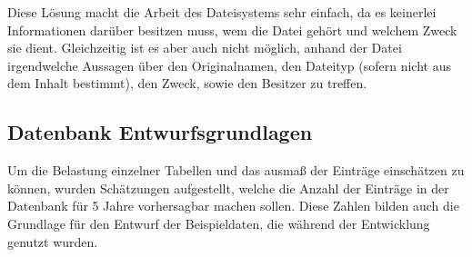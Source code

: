 Diese Lösung macht die Arbeit des Dateisystems sehr einfach, da es keinerlei Informationen darüber besitzen muss, wem die Datei gehört und welchem Zweck sie dient. Gleichzeitig ist es aber auch nicht möglich, anhand der Datei irgendwelche Aussagen über den Originalnamen, den Dateityp (sofern nicht aus dem Inhalt bestimmt), den Zweck, sowie den Besitzer zu treffen.

\subsection{Datenbank Entwurfsgrundlagen}
Um die Belastung einzelner Tabellen und das ausmaß der Einträge einschätzen zu können, wurden Schätzungen aufgestellt, welche die Anzahl der Einträge in der Datenbank für 5 Jahre vorhersagbar machen sollen. Diese Zahlen bilden auch die Grundlage für den Entwurf der Beispieldaten, die während der Entwicklung genutzt wurden.

